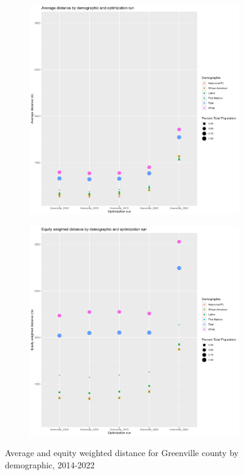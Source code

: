 \documentclass[11pt]{article}
\theoremstyle{remark}
\theoremstyle{definition}
\begin{document}
\begin{figure}
	\begin{subfigure}{.8\textwidth}
		\centering
		\includegraphics[width=.8\linewidth]{result_analysis/Greenville_SC_original_configs/orig_pop_scaled_avg}
		\label{sfig:Greenville avg dist}
	\end{subfigure} \newline
	\begin{subfigure}{.8\textwidth}
		\centering
		\includegraphics[width=.8\linewidth]{result_analysis/Greenville_SC_original_configs/orig_pop_scaled_y_EDE}
		\label{sfig:Greenville equity dist}
	\end{subfigure}
	\caption{Average and equity weighted distance for Greenville county by demographic, 2014-2022}
	\label{fig:Greenville distance graphs}
\end{figure}
\end{document}
